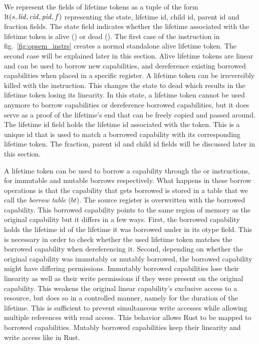 We represent the fields of lifetime tokens as a tuple of the form $\mathrm{lt}(s,\mathit{lid},\mathit{cid},\mathit{pid},f)$ representing the state, lifetime id, child id, parent id and fraction fields.
The state field indicates whether the lifetime associated with the lifetime token is alive () or dead ().
The first case of the  instruction in fig.\ \ref{fig:opsem_instrs} creates a normal standalone alive lifetime token.
The second case will be explained later in this section.
Alive lifetime tokens are linear and can be used to borrow new capabilities, and dereference existing borrowed capabilities when placed in a specific register.
A lifetime token can be irreversibly killed with the  instruction.
This changes the state to dead which results in the lifetime token losing its linearity.
In this state, a lifetime token cannot be used anymore to borrow capabilities or dereference borrowed capabilities, but it does serve as a proof of the lifetime's end that can be freely copied and passed around.
The lifetime id field holds the lifetime id associated with the token.
This is a unique id that is used to match a borrowed capability with its corresponding lifetime token.
The fraction, parent id and child id fields will be discussed later in this section.

A lifetime token can be used to borrow a capability through the  or  instructions, for immutable and mutable borrows respectively.
What happens in these borrow operations is that the capability that gets borrowed is stored in a table that we call the \emph{borrow table} ($bt$).
The source register is overwritten with the borrowed capability.
This borrowed capability points to the same region of memory as the original capability but it differs in a few ways.
First, the borrowed capability holds the lifetime id of the lifetime it was borrowed under in its otype field.
This is necessary in order to check whether the used lifetime token matches the borrowed capability when dereferencing it.
Second, depending on whether the original capability was immutably or mutably borrowed, the borrowed capability might have differing permissions.
Immutably borrowed capabilities lose their linearity as well as their write permissions if they were present on the original capability.
This weakens the original linear capability's exclusive access to a resource, but does so in a controlled manner, namely for the duration of the lifetime.
This is sufficient to prevent simultaneous write accesses while allowing multiple references with read access.
This behavior allows Rust to be mapped to borrowed capabilities.
Mutably borrowed capabilities keep their linearity and write access like in Rust.

